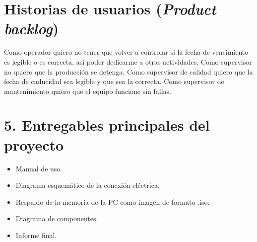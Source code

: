 \documentclass[11pt]{charter}
\begin{document}


\section{Historias de usuarios (\textit{Product backlog})}
\label{sec:backlog}


Como operador quiero no tener que volver a controlar si la fecha de vencimiento es legible o es correcta, así poder dedicarme a otras actividades.\newline
Como supervisor no quiero que la producción se detenga. \newline
Como supervisor de calidad quiero que la fecha de caducidad sea legible y que sea la correcta.\newline
Como supervisor de mantenimiento quiero que el equipo funcione sin fallas. 



\section{5. Entregables principales del proyecto}
\label{sec:entregables}

\begin{itemize}
\item Manual de uso.
\item Diagrama esquemático de la conexión eléctrica. 
\item Respaldo de la memoria de la PC como imagen de formato .iso.
\item Diagrama de componentes.
\item Informe final.

\end{itemize}
\end{document}

